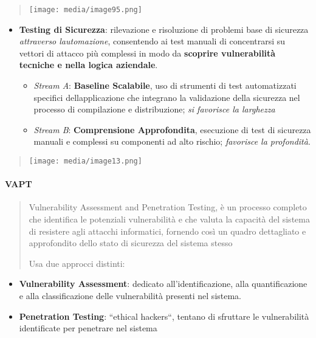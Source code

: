 \begin{quote}
\texttt{[image: media/image95.png]}
\end{quote}

\begin{itemize}
\item
  \textbf{Testing di Sicurezza}: rilevazione e risoluzione di problemi
  base di sicurezza \emph{attraverso l\textquotesingle automazione},
  consentendo ai test manuali di concentrarsi su vettori di attacco più
  complessi in modo da \textbf{scoprire vulnerabilità tecniche e nella
  logica aziendale}.

  \begin{itemize}
  \item
    \emph{Stream A}: \textbf{Baseline Scalabile}, uso di strumenti di
    test automatizzati specifici dell\textquotesingle applicazione che
    integrano la validazione della sicurezza nel processo di
    compilazione e distribuzione; \emph{si favorisce la larghezza}
  \item
    \emph{Stream B}: \textbf{Comprensione Approfondita}, esecuzione di
    test di sicurezza manuali e complessi su componenti ad alto rischio;
    \emph{favorisce la profondità}.
  \end{itemize}
\end{itemize}

\begin{quote}
\texttt{[image: media/image13.png]}
\end{quote}

\paragraph{VAPT}\label{vapt}

\begin{quote}
Vulnerability Assessment and Penetration Testing, è un processo completo
che identifica le potenziali vulnerabilità e che valuta la capacità del
sistema di resistere agli attacchi informatici, fornendo così un quadro
dettagliato e approfondito dello stato di sicurezza del sistema stesso

Usa due approcci distinti:
\end{quote}

\begin{itemize}
\item
  \textbf{Vulnerability Assessment}: dedicato all'identificazione, alla
  quantificazione e alla classificazione delle vulnerabilità presenti
  nel sistema.
\item
  \textbf{Penetration Testing}: ``ethical hackers``, tentano di
  sfruttare le vulnerabilità identificate per penetrare nel sistema
\end{itemize}

